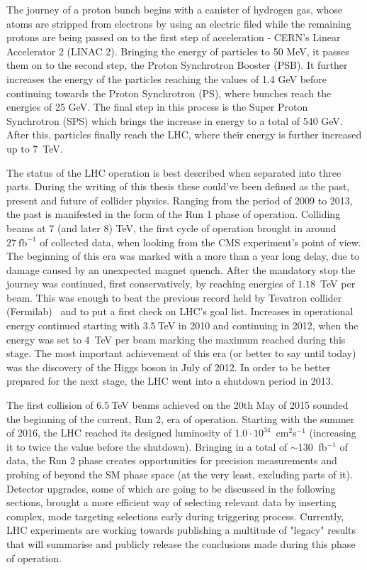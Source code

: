 \hspace{10pt} The journey of a proton bunch begins with a canister of hydrogen gas, whose atoms are stripped from electrons by using an electric filed while the remaining protons are being passed on to the first step of acceleration - CERN's Linear Accelerator 2 (LINAC 2). Bringing the energy of particles to 50 MeV, it passes them on to the second step, the Proton Synchrotron Booster (PSB).  It further increases the energy of the particles reaching the values of 1.4 GeV before continuing towards the Proton Synchrotron (PS), where bunches reach the energies of 25 GeV. The final step in this process is the Super Proton Synchrotron (SPS) which brings the increase in energy to a total of 540 GeV. After this, particles finally reach the LHC, where their energy is further increased up to 7~TeV.


\hspace{10pt} The status of the LHC operation is best described when separated into three parts. During the writing of this thesis these could've been defined as the past, present and future of collider physics. Ranging from the period of 2009 to 2013, the past is manifested in the form of the Run 1 phase of operation. Colliding beams at 7 (and later 8) TeV, the first cycle of operation brought in around $27~\text{fb}^{-1}$ of collected data, when looking from the CMS experiment's point of view. The beginning of this era was marked with a more than a year long delay, due to damage caused by an unexpected magnet quench. After the mandatory stop the journey was continued, first conservatively, by reaching energies of $1.18$~TeV per beam. This was enough to beat the previous record held by Tevatron collider (Fermilab)~\cite{tevatron_summary} and to put a first check on LHC's goal list. Increases in operational energy continued starting with $3.5~$TeV in 2010 and continuing in 2012, when the energy was set to $4$~TeV per beam marking the maximum reached during this stage. The most important achievement of this era (or better to say until today) was the discovery of the Higgs boson in July of 2012. In order to be better prepared for the next stage, the LHC went into a shutdown period in 2013. 

\hspace{10pt} The first collision of $6.5~$TeV beams achieved on the 20th May of 2015 sounded the beginning of the current, Run 2, era of operation. Starting with the summer of 2016, the LHC reached its designed luminosity of $1.0\cdot10^{34}$~cm$^2$s$^{-1}$ (increasing it to twice the value before the shutdown). Bringing in a total of $\sim130~$ fb$^{-1}$ of data, the Run 2 phase creates opportunities for precision measurements and probing of beyond the SM phase space (at the very least, excluding parts of it). Detector upgrades, some of which are going to be discussed in the following sections, brought a more efficient way of selecting relevant data by inserting complex, mode targeting selections early during triggering process. Currently, LHC experiments are working towards publishing a multitude of "legacy" results that will summarise and publicly release the conclusions made during this phase of operation.

